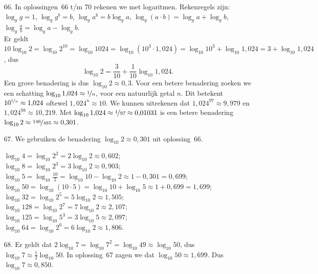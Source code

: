 \begin{problem}{66.}
	In oplossingen~66 t/m 70 rekenen we met logaritmen. Reken\-regels zijn: $\log_g g = 1$, $\log_g g^b = b$, $\log_g a^b = b \log_g a$, $\log_g (a \cdot b) = \log_g a + \log_g b$, $\log_g \frac{a}{b} = \log_g a - \log_g b$.\\

    Er geldt $10 \log_{10} 2 = \log_{10} 2^{10} = \log_{10} 1024 = \log_{10} ({10}^3 \cdot 1{,}024) = \log_{10} {10}^3 + \log_{10} 1{,}024 = 3 + \log_{10} 1{,}024$, dus
    \begin{equation*}
        \log_{10} 2 = \frac{3}{10} + \frac{1}{10} \log_{10} 1{,}024.
    \end{equation*}
    Een grove benadering is dus $\log_{10} 2 \approx 0{,}3$. Voor een betere benadering zoeken we een schatting $\log_{10} 1{,}024 \approx \nicefrac{1}{n}$, voor een natuurlijk getal $n$. Dit betekent ${10}^{\nicefrac{1}{n}} \approx 1{,}024$ oftewel ${1{,}024}^n \approx 10$. We kunnen uitrekenen dat ${1{,}024}^{97} \approx 9{,}979$ en ${1{,}024}^{98} \approx 10{,}219$. Met $\log_{10} 1{,}024 \approx \nicefrac{1}{97} \approx 0{,}01031$ is een betere benadering $\log_{10} 2 \approx \nicefrac{146}{485} \approx 0{,}301$.
\end{problem}

\begin{problem}{67.}
	We gebruiken de benadering $\log_{10} 2 \approx 0{,}301$ uit oplossing~66.

\noindent $\log_{10} 4 = \log_{10} 2^2 = 2 \log_{10} 2 \approx 0{,}602$;\\
$\log_{10} 8 = \log_{10} 2^3 = 3 \log_{10} 2 \approx 0{,}903$;\\
$\log_{10} 5 = \log_{10} \frac{10}{2} = \log_{10} 10 - \log_{10} 2 \approx 1 - 0{,}301 = 0{,}699$;\\
$\log_{10} 50 = \log_{10} (10 \cdot 5) = \log_{10} 10 + \log_{10} 5 \approx 1 + 0{,}699 = 1{,}699$;\\
$\log_{10} 32 = \log_{10} 2^5 = 5 \log_{10} 2 \approx 1{,}505$;\\
$\log_{10} 128 = \log_{10} 2^7 = 7 \log_{10} 2 \approx 2{,}107$;\\
$\log_{10} 125 = \log_{10} 5^3 = 3 \log_{10} 5 \approx 2{,}097$;\\
$\log_{10} 64 = \log_{10} 2^6 = 6 \log_{10} 2 \approx 1{,}806$.
\end{problem}

\begin{problem}{68.}
	Er geldt dat $2 \log_{10} 7 = \log_{10} 7^2 = \log_{10} 49 \approx \log_{10} 50$, dus $\log_{10} 7 \approx \frac{1}{2} \log_{10} 50$. In oplossing~67 zagen we dat $\log_{10} 50 \approx 1{,}699$. Dus $\log_{10} 7 \approx 0{,}850$.
\end{problem}

